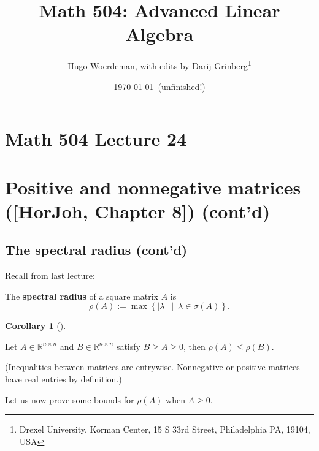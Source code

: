 \documentclass[numbers=enddot,12pt,final,onecolumn,notitlepage]{scrartcl}%
\numberwithin{exer}{subsection}
\theoremstyle{definition}
\newtheorem{coro}[theo]{Corollary}
\newenvironment{corollary}[1][]
{\begin{coro}[#1]\begin{leftbar}}
{\end{leftbar}\end{coro}}
\begin{document}
\title{Math 504: Advanced Linear Algebra}
\author{Hugo Woerdeman, with edits by Darij Grinberg\thanks{Drexel University, Korman
Center, 15 S 33rd Street, Philadelphia PA, 19104, USA}}
\date{\today\ (unfinished!)}
\maketitle
\tableofcontents

\section*{Math 504 Lecture 24}

\section{Positive and nonnegative matrices ([HorJoh, Chapter 8]) (cont'd)}

\subsection{The spectral radius (cont'd)}

Recall from last lecture:

The \textbf{spectral radius} of a square matrix $A$ is%
\[
\rho\left(  A\right)  :=\max\left\{  \left\vert \lambda\right\vert
\ \mid\ \lambda\in\sigma\left(  A\right)  \right\}  .
\]


\begin{corollary}
Let $A\in\mathbb{R}^{n\times n}$ and $B\in\mathbb{R}^{n\times n}$ satisfy
$B\geq A\geq0$, then $\rho\left(  A\right)  \leq\rho\left(  B\right)  $.
\end{corollary}

(Inequalities between matrices are entrywise. Nonnegative or positive matrices
have real entries by definition.)

\bigskip

Let us now prove some bounds for $\rho\left(  A\right)  $ when $A\geq0$.
\end{document}
